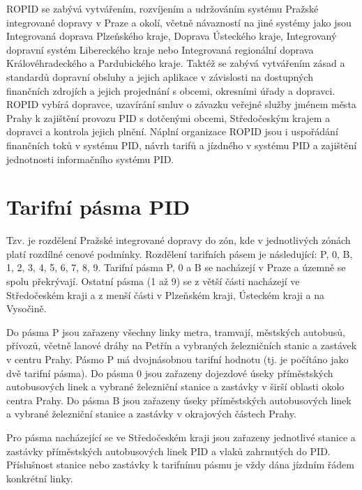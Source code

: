ROPID se zabývá vytvářením, rozvíjením a udržováním systému Pražské integrované dopravy v Praze a okolí,
včetně návazností na jiné systémy jako jsou Integrovaná doprava Plzeňského kraje,
Doprava Ústeckého kraje, Integrovaný dopravní systém Libereckého kraje nebo 
Integrovaná regionální doprava Královéhradeckého a Pardubického kraje.
Taktéž se zabývá vytvářením zásad a standardů dopravní obsluhy a jejich aplikace v závislosti
na dostupných finančních zdrojích a jejich projednání s obcemi, okresními úřady a dopravci.
ROPID vybírá dopravce, uzavírání smluv o závazku veřejné služby jménem města Prahy 
k zajištění provozu PID s dotčenými obcemi, Středočeským krajem a dopravci a kontrola jejich plnění.
Náplní organizace ROPID jsou i uspořádání finančních toků v systému PID, návrh tarifů a jízdného v systému PID a
zajištění jednotnosti informačního systému PID.  \cite{wikipedia-ropid}

\section{Tarifní pásma PID}
                    
Tzv.  je rozdělení Pražské integrované dopravy do zón, kde v jednotlivých
zónách platí rozdílné cenové podmínky. Rozdělení tarifních pásem je následující:
P, 0, B, 1, 2, 3, 4, 5, 6, 7, 8, 9. Tarifní pásma P, 0 a B se nacházejí v Praze a územně
se spolu překrývají. Ostatní pásma (1 až 9) se z větší části nacházejí ve Středočeském kraji a z
menší části v Plzeňském kraji, Ústeckém kraji a na Vysočině.

Do pásma P jsou zařazeny všechny linky metra, tramvají, městských autobusů, přívozů,
včetně lanové dráhy na Petřín a vybraných železničních stanic a zastávek v centru Prahy.
Pásmo P má dvojnásobnou tarifní hodnotu (tj. je počítáno jako dvě tarifní pásma).
Do pásma 0 jsou zařazeny dojezdové úseky příměstských autobusových linek a vybrané
železniční stanice a zastávky v širší oblasti okolo centra Prahy.
Do pásma B jsou zařazeny úseky příměstských autobusových linek a vybrané 
železniční stanice a zastávky v okrajových částech Prahy. 

Pro pásma nacházející se ve Středočeském kraji jsou zařazeny jednotlivé stanice 
a zastávky příměstských autobusových linek PID a vlaků zahrnutých do PID. 
Příslušnost stanice nebo zastávky k tarifnímu pásmu je vždy dána jízdním řádem konkrétní linky.\cite{pid}

